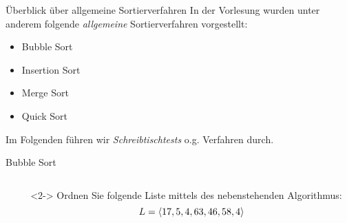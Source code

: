 \begin{frame}{\"Uberblick \"uber allgemeine Sortierverfahren}
In der Vorlesung wurden unter anderem folgende \emph{allgemeine} Sortierverfahren vorgestellt:
\begin{itemize}
    \item Bubble Sort
    \item Insertion Sort
    \item Merge Sort
    \item Quick Sort
\end{itemize}
Im Folgenden f\"uhren wir \emph{Schreibtischtests} o.g. Verfahren durch.
\end{frame}

\begin{frame}{Bubble Sort}
\begin{columns}[T,onlytextwidth]
\begin{column}{0.4\textwidth}
\begin{algorithm}[H]
	\caption{Bubble Sort}
	\label{sort:alg:bubblesort}
	\DontPrintSemicolon
    \;
\end{algorithm}
\end{column}
\begin{column}{0.55\textwidth}
\begin{task}<2->
Ordnen Sie folgende Liste mittels des nebenstehenden Algorithmus: $$L = \langle17, 5, 4, 63, 46, 58, 4\rangle$$
\end{task}

\end{column}
\end{columns}
\end{frame}


